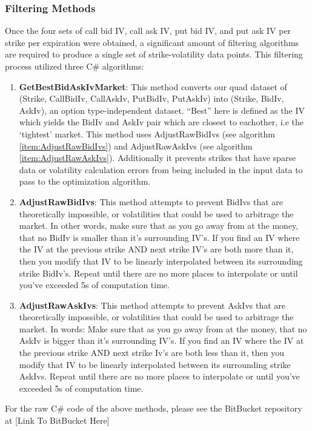 \documentclass[12pt, a4paper, notitlepage]{article}
\numberwithin{equation}{subsection}
\numberwithin{figure}{subsection}
\numberwithin{table}{subsection}
\newcommand{\bbrepo}{[Link To BitBucket Here]}
\begin{document}
\subsubsection{Filtering Methods}\label{sec:FilteringMethods}
Once the four sets of call bid IV, call ask IV, put bid IV, and put ask IV per strike per expiration were obtained, a significant amount of filtering algorithms are required to produce a single set of strike-volatility data points.  This filtering process utilized three C\# algorithms:

\begin{enumerate}
	\item \textbf{GetBestBidAskIvMarket}:  This method converts our quad dataset of (Strike, CallBidIv, CallAskIv, PutBidIv, PutAskIv) into (Strike, BidIv, AskIv), an option type-independent dataset.  ``Best'' here is defined as the IV which yields the BidIv and AskIv pair which are closest to eachother, i.e the `tightest' market.  This method uses AdjustRawBidIvs (see algorithm \ref{item:AdjustRawBidIvs}) and AdjustRawAskIvs (see algorithm \ref{item:AdjustRawAskIvs}).  Additionally it prevents strikes that have sparse data or volatility calculation errors from being included in the input data to pass to the optimization algorithm. 
    \item \textbf{AdjustRawBidIvs}: This method attempts to prevent BidIvs that are theoretically impossible, or volatilities that could be used to arbitrage the market.  In other words, make sure that as you go away from at the money, that no BidIv is smaller than it's surrounding IV's.  If you find an IV where the IV at the previous strike AND next strike IV's are both more than it, then you modify that IV to be linearly interpolated between its surrounding strike BidIv's.  Repeat until there are no more places to interpolate or until you’ve exceeded 5s of computation time.\label{item:AdjustRawBidIvs}
    \item \textbf{AdjustRawAskIvs}:  This method attempts to prevent AskIvs that are theoretically impossible, or volatilities that could be used to arbitrage the market.  In words: Make sure that as you go away from at the money, that no AskIv is bigger than it's surrounding IV's.  If you find an IV where the IV at the previous strike AND next strike Iv's are both less than it, then you modify that IV to be linearly interpolated between its surrounding strike AskIvs.  Repeat until there are no more places to interpolate or until you’ve exceeded 5s of computation time.\label{item:AdjustRawAskIvs}
\end{enumerate}
For the raw C\# code of the above methods, please see the BitBucket repository at \bbrepo
\end{document}
